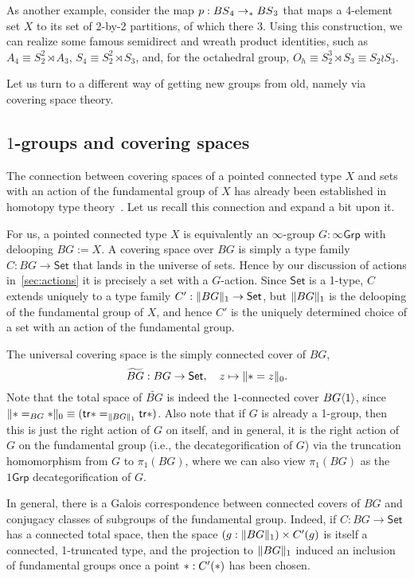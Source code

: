 As another example,
consider the map $p : \BS_4 \to_\pt \BS_3$ that maps a 4-element set
$X$ to its set of 2-by-2 partitions, of which there $3$. Using this
construction, we can realize some famous semidirect and wreath product identities,
such as $A_4 \equiv S_2^2 \rtimes A_3$, $S_4 \equiv S_2^2 \rtimes
S_3$, and, for the octahedral group, $O_h \equiv S_2^3 \rtimes S_3
\equiv S_2 \wr S_3$.

\smallskip

Let us turn to a different way of getting new groups from old, namely
via covering space theory.

\subsection{\texorpdfstring{$1$}{1}-groups and covering spaces}
\label{sec:covering}

The connection between covering spaces of a pointed connected type
$X$ and sets with an action of the fundamental group of $X$ has
already been established in homotopy type
theory~\cite{FavoniaHarper2016}. Let us recall this connection and
expand a bit upon it.

For us, a pointed connected type $X$ is equivalently
an $\infty$-group $G:\infty\mathsf{Grp}$
with delooping $BG := X$.
A covering space over $BG$ is simply a type family $C : BG \to \mathsf{Set}$
that lands in the universe of sets.
Hence by our discussion of actions in~\cref{sec:actions}
it is precisely a set with a $G$-action.
Since $\mathsf{Set}$ is a 1-type, $C$ extends uniquely to a type family
$C' : \trunc{1}{BG} \to \mathsf{Set}$,
but $\trunc{1}{BG}$ is the delooping of the fundamental group
of $X$, and hence $C'$ is the uniquely determined
choice of a set with an action of the fundamental group.

The universal covering space is the simply connected cover of $BG$,
\[
  \widetilde{BG} : BG \to \mathsf{Set}, \quad
  z \mapsto \trunc{0}{\pt = z}.
\]
Note that the total space of $\widetilde{BG}$ is indeed the
$1$-connected cover $BG\angled1$,
since $\trunc{0}{\pt =_{BG} \pt} \equiv (\tr{\pt} =_{\trunc{1}{BG}} \tr{\pt})$.
Also note that if $G$ is already a 1-group, then this is just the right
action of $G$ on itself, and in general, it is the right action of $G$
on the fundamental group
(i.e., the decategorification of $G$)
via the truncation homomorphism from $G$ to $\pi_1(BG)$,
where we can also view $\pi_1(BG)$ as the $1\mathsf{Grp}$ decategorification
of $G$.

In general, there is a Galois correspondence between connected covers
of $BG$ and conjugacy classes of subgroups of the fundamental group.
Indeed, if $C : BG \to \mathsf{Set}$ has a connected total space,
then the space $(g : \trunc{1}{BG}) \times C'(g)$
is itself a connected, 1-truncated type,
and the projection to $\trunc{1}{BG}$
induced an inclusion of fundamental groups
once a point $\pt : C'(\pt)$ has been chosen.

